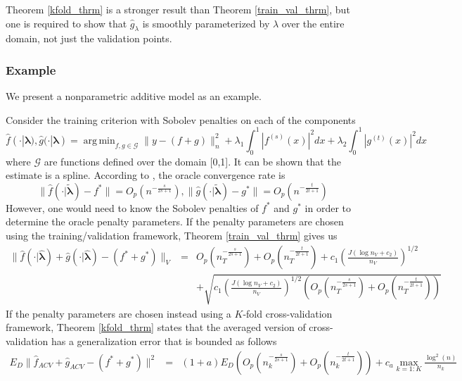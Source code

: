 \documentclass[12pt]{article}
\DeclareMathOperator*{\argmin}{arg\,min}
\begin{document}
Theorem \ref{kfold_thrm} is a stronger result than Theorem \ref{train_val_thrm}, but one is required to show that $\hat{g}_\lambda$ is smoothly parameterized by $\lambda$ over the entire domain, not just the validation points.

\subsubsection{Example}

We present a nonparametric additive model as an example.

Consider the training criterion with Sobolev penalties on each of the components
\begin{equation}
\hat{f}(\cdot | {\boldsymbol \lambda}), \hat{g}(\cdot | {\boldsymbol \lambda}) =
\argmin_{f,g \in \mathcal{G}}
\| y - (f + g) \|_n^2 +
\lambda_1 \int_0^1 |f^{(s)}(x)|^2 dx +
\lambda_2 \int_0^1 |g^{(t)}(x)|^2 dx
\end{equation}
where $\mathcal{G}$ are functions defined over the domain [0,1].
It can be shown that the estimate is a spline. According to \citet{van2014additive}, the oracle convergence rate is
\begin{equation}
\| \hat{f}(\cdot | \tilde{\boldsymbol{\lambda}}) - f^* \| = O_p(n^{-\frac{s}{2s+1}}),
\| \hat{g}(\cdot | \tilde{\boldsymbol{\lambda}}) - g^* \| = O_p(n^{-\frac{t}{2t+1}})
\end{equation}
However, one would need to know the Sobolev penalties of $f^*$ and $g^*$ in order
to determine the oracle penalty parameters.
If the penalty parameters are chosen using the training/validation framework, Theorem \ref{train_val_thrm} gives us
\begin{eqnarray*}
\| \hat{f}(\cdot | \hat{\boldsymbol{\lambda}}) + \hat{g}(\cdot | \hat{\boldsymbol{\lambda}}) - (f^* + g^*) \|_V &=&
O_p(n_T^{-\frac{s}{2s+1}}) + O_p(n_T^{-\frac{t}{2t+1}})
+c_{1} \left (\frac{J(\log n_{V}+c_{2})}{n_{V}} \right )^{1/2} \\
&& +\sqrt{ c_{1} \left (\frac{J(\log n_{V}+c_{2})}{n_{V}} \right )^{1/2}  \left (O_p(n_T^{-\frac{s}{2s+1}}) + O_p(n_T^{-\frac{t}{2t+1}}) \right) }
\end{eqnarray*}
If the penalty parameters are chosen instead using a $K$-fold cross-validation framework, Theorem \ref{kfold_thrm} states that the
averaged version of cross-validation has a generalization error that is bounded as follows
\begin{eqnarray*}
E_D \| \hat{f}_{ACV} + \hat{g}_{ACV} - (f^* + g^*) \|^2 &=&
(1+a) E_D  \left (O_p(n_k^{-\frac{s}{2s+1}}) + O_p(n_k^{-\frac{t}{2t+1}})  \right )
+ c_a \max_{k=1:K} \frac{\log^2(n)}{n_k}
\end{eqnarray*}
\end{document}
